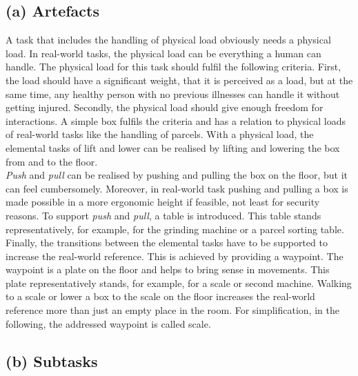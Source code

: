 \subsection{(a) Artefacts}
A task that includes the handling of physical load obviously needs a physical load. In real-world tasks, the physical load can be everything a human can handle. The physical load for this task should fulfil the following criteria. First, the load should have a significant weight, that it is perceived as a load, but at the same time, any healthy person with no previous illnesses can handle it without getting injured. Secondly, the physical load should give enough freedom for interactions. A simple box fulfils the criteria and has a relation to physical loads of real-world tasks like the handling of parcels. With a physical load, the elemental tasks of lift and lower can be realised by lifting and lowering the box from and to the floor.\\
\textit{Push} and \textit{pull} can be realised by pushing and pulling the box on the floor, but it can feel cumbersomely. Moreover, in real-world task pushing and pulling a box is made possible in a more ergonomic height if feasible, not least for security reasons. To support \textit{push} and \textit{pull}, a table is introduced. This table stands representatively, for example, for the grinding machine or a parcel sorting table.\\
Finally, the transitions between the elemental tasks have to be supported to increase the real-world reference. This is achieved by providing a waypoint. The waypoint is a plate on the floor and helps to bring sense in movements. This plate representatively stands, for example, for a scale or second machine. Walking to a scale or lower a box to the scale on the floor increases the real-world reference more than just an empty place in the room. For simplification, in the following, the addressed waypoint is called scale.

\subsection{(b) Subtasks}
\label{sec:subTasks}

